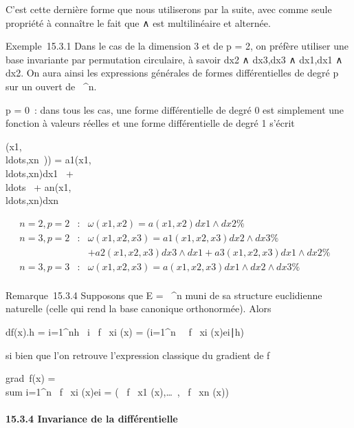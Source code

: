 C'est cette dernière forme que nous utiliserons par la suite, avec comme
seule propriété à connaître le fait que ∧ est multilinéaire et alternée.

Exemple~15.3.1 Dans le cas de la dimension 3 et de p = 2, on préfère
utiliser une base invariante par permutation circulaire, à savoir
dx2 ∧ dx3,dx3 ∧
dx1,dx1 ∧ dx2. On aura ainsi les
expressions générales de formes différentielles de degré p sur un ouvert
de ~^n.

p = 0~: dans tous les cas, une forme différentielle de degré 0 est
simplement une fonction à valeurs réelles et une forme différentielle de
degré 1 s'écrit

\omega(x1,\\ldots,xn~))
=
a1(x1,\\ldots,xn)dx1~
+ \\ldots~ +
an(x1,\\ldots,xn)dxn~

\begin{align*} n = 2,p = 2& :&
\omega(x1,x2) = a(x1,x2)dx1
∧ dx2 \%& \\ n = 3,p = 2& :&
\omega(x1,x2,x3) =
a1(x1,x2,x3)dx2 ∧
dx3 \%& \\ & &
+a2(x1,x2,x3)dx3 ∧
dx1 +
a3(x1,x2,x3)dx1 ∧
dx2\%& \\ n = 3,p = 3& :&
\omega(x1,x2,x3) =
a(x1,x2,x3)dx1 ∧ dx2 ∧
dx3 \%& \\
\end{align*}



Remarque~15.3.4 Supposons que E = ~^n muni de sa structure
euclidienne naturelle (celle qui rend la base canonique orthonormée).
Alors

df(x).h = \sum i=1^nh~
i \partial~f \over \partial~xi (x) =
(\sum i=1^n~ \partial~f
\over \partial~xi
(x)ei∣h)

si bien que l'on retrouve l'expression classique du gradient de f

grad~f(x) = \\sum
i=1^n \partial~f \over \partial~xi
(x)ei = ( \partial~f \over \partial~x1
(x),\ldots~, \partial~f \over
\partial~xn (x))

\paragraph{15.3.4 Invariance de la différentielle}

